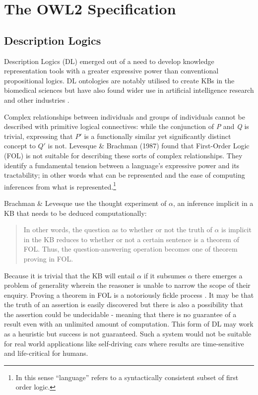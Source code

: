 \documentclass[titlepage,a4paper,12pt,oneside]{book}
\begin{document}
\chapter{The OWL2 Specification}
\section{Description Logics}
Description Logics (DL) emerged out of a need to develop knowledge representation tools with a greater expressive power than conventional propositional logics.
DL ontologies are notably utilised to create KBs in the biomedical sciences but have also found wider use in artificial intelligence research and other industries \cite[29]{handbookIntro2003}.\par
Complex relationships between individuals and groups of individuals cannot be described with primitive logical connectives: while the conjunction of \textit{P} and \textit{Q} is trivial, expressing that \textit{$P'$} is a functionally similar yet significantly distinct concept to \textit{$Q'$} is not.
Levesque \& Brachman (1987) found that First-Order Logic (FOL) is not suitable for describing these sorts of complex relationships.
They identify a fundamental tension between a language's expressive power and its tractability; in other words what can be represented and the ease of computing inferences from what is represented.\footnote{In this sense ``language'' refers to a syntactically consistent subset of first order logic.}\par
Brachman \& Levesque use the thought experiment of \(\alpha\), an inference implicit in a KB that needs to be deduced computationally:  
\begin{quote}
  In other words, the question as to whether or not the truth of \(\alpha\) is implicit in the KB reduces to whether or not a certain sentence is a theorem of FOL. Thus, the question-answering operation becomes one of theorem proving in FOL. \cite[79]{expressiveness1987}
\end{quote}
Because it is trivial that the KB will entail \(\alpha\) if it subsumes \(\alpha\) there emerges a problem of generality wherein the reasoner is unable to narrow the scope of their enquiry.
Proving a theorem in FOL is a notoriously fickle process \cite[91]{expressiveness1987}.
It may be that the truth of an assertion is easily discovered but there is also a possibility that the assertion could be undecidable - meaning that there is no guarantee of a result even with an unlimited amount of computation.
This form of DL may work as a heuristic but success is not guaranteed. Such a system would not be suitable for real world applications like self-driving cars where results are time-sensitive and life-critical for humans.\par
\end{document}
